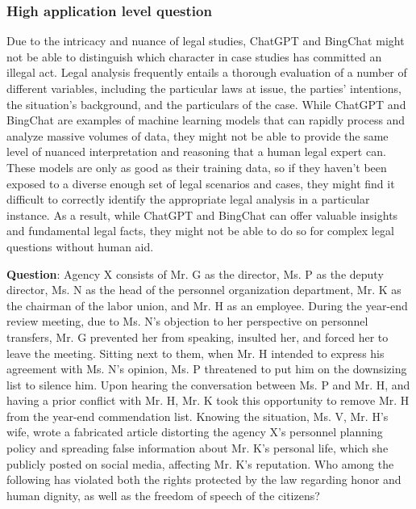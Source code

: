 \documentclass{article}
\begin{document}
{\begin{mdframed}[linewidth=1pt,linecolor=red]
	\end{mdframed}	
	
	\subsubsection{High application level question}
	\label{VNHSGE_Civ_H}
	
	Due to the intricacy and nuance of legal studies, ChatGPT and BingChat might not be able to distinguish which character in case studies has committed an illegal act. Legal analysis frequently entails a thorough evaluation of a number of different variables, including the particular laws at issue, the parties' intentions, the situation's background, and the particulars of the case. While ChatGPT and BingChat are examples of machine learning models that can rapidly process and analyze massive volumes of data, they might not be able to provide the same level of nuanced interpretation and reasoning that a human legal expert can.  These models are only as good as their training data, so if they haven't been exposed to a diverse enough set of legal scenarios and cases, they might find it difficult to correctly identify the appropriate legal analysis in a particular instance. As a result, while ChatGPT and BingChat can offer valuable insights and fundamental legal facts, they might not be able to do so for complex legal questions without human aid.
	
	
	
	\begin{mdframed}[linewidth=1pt,linecolor=red] \textbf{Question}: Agency X consists of Mr. G as the director, Ms. P as the deputy director, Ms. N as the head of the personnel organization department, Mr. K as the chairman of the labor union, and Mr. H as an employee. During the year-end review meeting, due to Ms. N's objection to her perspective on personnel transfers, Mr. G prevented her from speaking, insulted her, and forced her to leave the meeting. Sitting next to them, when Mr. H intended to express his agreement with Ms. N's opinion, Ms. P threatened to put him on the downsizing list to silence him. Upon hearing the conversation between Ms. P and Mr. H, and having a prior conflict with Mr. H, Mr. K took this opportunity to remove Mr. H from the year-end commendation list. Knowing the situation, Ms. V, Mr. H's wife, wrote a fabricated article distorting the agency X's personnel planning policy and spreading false information about Mr. K's personal life, which she publicly posted on social media, affecting Mr. K's reputation. Who among the following has violated both the rights protected by the law regarding honor and human dignity, as well as the freedom of speech of the citizens? 
		

\end{mdframed}}
\end{document}
